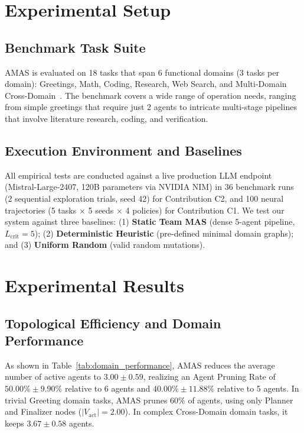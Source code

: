 ﻿\documentclass[conference]{IEEEtran}
\begin{document}
\section{Experimental Setup}
\label{sec:experimental_setup}

\subsection{Benchmark Task Suite}
AMAS is evaluated on 18 tasks that span 6 functional domains (3 tasks per domain): Greetings, Math, Coding, Research, Web Search, and Multi-Domain Cross-Domain~\cite{liu2024agentbench}. The benchmark covers a wide range of operation needs, ranging from simple greetings that require just 2 agents to intricate multi-stage pipelines that involve literature research, coding, and verification.

\subsection{Execution Environment and Baselines}
All empirical tests are conducted against a live production LLM endpoint (Mistral-Large-2407, 120B parameters via NVIDIA NIM) in 36 benchmark runs (2 sequential exploration trials, seed 42) for Contribution C2, and 100 neural trajectories (5 tasks $\times$ 5 seeds $\times$ 4 policies) for Contribution C1. We test our system against three baselines: (1) \textbf{Static Team MAS} (dense 5-agent pipeline, $L_{\mathrm{crit}}=5$); (2) \textbf{Deterministic Heuristic} (pre-defined minimal domain graphs); and (3) \textbf{Uniform Random} (valid random mutations).

\section{Experimental Results}
\label{sec:experimental_results}

\subsection{Topological Efficiency and Domain Performance}
As shown in Table~\ref{tab:domain_performance}, AMAS reduces the average number of active agents to $\mathbf{3.00 \pm 0.59}$, realizing an Agent Pruning Rate of $\mathbf{50.00\% \pm 9.90\%}$ relative to 6 agents and $\mathbf{40.00\% \pm 11.88\%}$ relative to 5 agents. In trivial Greeting domain tasks, AMAS prunes 60\% of agents, using only Planner and Finalizer nodes ($|V_{\mathrm{act}}| = 2.00$). In complex Cross-Domain domain tasks, it keeps $3.67 \pm 0.58$ agents.
\end{document}
